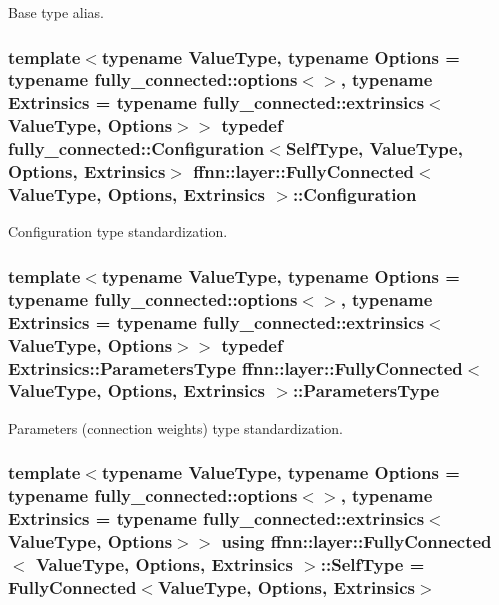 Base type alias. 

\hypertarget{classffnn_1_1layer_1_1_fully_connected_a0f17b9785828b21e00a8fe84fd173406}{
\subsubsection[{Configuration}]{\setlength{\rightskip}{0pt plus 5cm}template$<$typename Value\-Type, typename Options = typename fully\-\_\-connected\-::options$<$$>$, typename Extrinsics = typename fully\-\_\-connected\-::extrinsics$<$\-Value\-Type, Options$>$$>$ typedef {\bf fully\-\_\-connected\-::\-Configuration}$<${\bf Self\-Type}, Value\-Type, Options, Extrinsics$>$ {\bf ffnn\-::layer\-::\-Fully\-Connected}$<$ Value\-Type, Options, Extrinsics $>$\-::{\bf Configuration}}}\label{classffnn_1_1layer_1_1_fully_connected_a0f17b9785828b21e00a8fe84fd173406}


Configuration type standardization. 

\hypertarget{classffnn_1_1layer_1_1_fully_connected_aab9cb25e10620b406a13414ac81747fa}{
\subsubsection[{Parameters\-Type}]{\setlength{\rightskip}{0pt plus 5cm}template$<$typename Value\-Type, typename Options = typename fully\-\_\-connected\-::options$<$$>$, typename Extrinsics = typename fully\-\_\-connected\-::extrinsics$<$\-Value\-Type, Options$>$$>$ typedef Extrinsics\-::\-Parameters\-Type {\bf ffnn\-::layer\-::\-Fully\-Connected}$<$ Value\-Type, Options, Extrinsics $>$\-::{\bf Parameters\-Type}}}\label{classffnn_1_1layer_1_1_fully_connected_aab9cb25e10620b406a13414ac81747fa}


Parameters (connection weights) type standardization. 

\hypertarget{classffnn_1_1layer_1_1_fully_connected_a886c7ef9b12d8835f0acb231f446e8cf}{
\subsubsection[{Self\-Type}]{\setlength{\rightskip}{0pt plus 5cm}template$<$typename Value\-Type, typename Options = typename fully\-\_\-connected\-::options$<$$>$, typename Extrinsics = typename fully\-\_\-connected\-::extrinsics$<$\-Value\-Type, Options$>$$>$ using {\bf ffnn\-::layer\-::\-Fully\-Connected}$<$ Value\-Type, Options, Extrinsics $>$\-::{\bf Self\-Type} =  {\bf Fully\-Connected}$<$Value\-Type, Options, Extrinsics$>$}}\label{classffnn_1_1layer_1_1_fully_connected_a886c7ef9b12d8835f0acb231f446e8cf}


